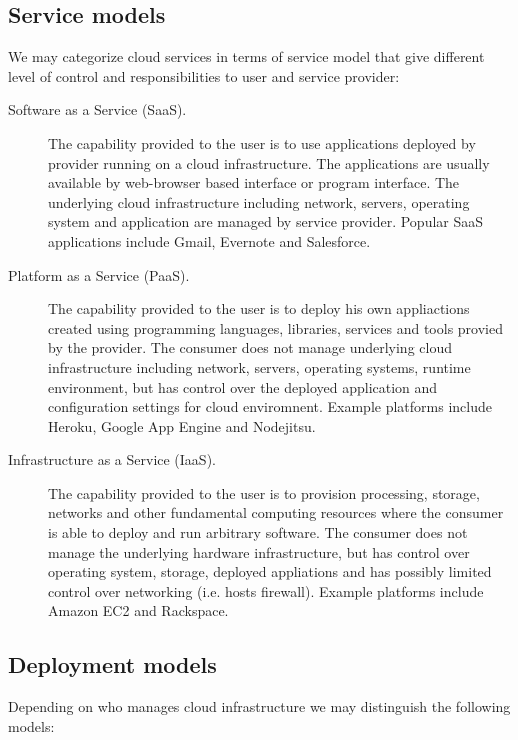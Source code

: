 \subsection{Service models}

We may categorize cloud services in terms of service model that give different level of control and responsibilities to user and service provider:

\begin{description}
  \item[Software as a Service (SaaS).] The capability provided to the user is to use applications deployed by provider running on a cloud infrastructure. The applications are usually available by web-browser based interface or program interface. The underlying cloud infrastructure including network, servers, operating system and application are managed by service provider. Popular SaaS applications include Gmail, Evernote and Salesforce.
  \item[Platform as a Service (PaaS).] The capability provided to the user is to deploy his own appliactions created using programming languages, libraries, services and tools provied by the provider. The consumer does not manage underlying cloud infrastructure including network, servers, operating systems, runtime environment, but has control over the deployed application and configuration settings for cloud enviromnent. Example platforms include Heroku, Google App Engine and Nodejitsu.
  \item[Infrastructure as a Service (IaaS).] The capability provided to the user is to provision processing, storage, networks and other fundamental computing resources where the consumer is able to deploy and run arbitrary software. The consumer does not manage the underlying hardware infrastructure, but has control over operating system, storage, deployed appliations and has possibly limited control over networking (i.e. hosts firewall). Example platforms include Amazon EC2 and Rackspace.
\end{description}

\subsection{Deployment models}

Depending on who manages cloud infrastructure we may distinguish the following models:

